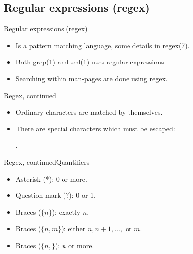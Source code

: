 \documentclass[handout]{beamer}
\begin{document}
\subsection{Regular expressions (regex)}

\begin{frame}{Regular expressions (regex)}
	\begin{itemize}
		\item Is a pattern matching language, some details in regex(7).

		\item Both grep(1) and sed(1) uses regular expressions.

		\item Searching within man-pages are done using regex.

	\end{itemize}
\end{frame}

\begin{frame}{Regex, continued}
	\begin{itemize}
		\item Ordinary characters are matched by themselves.

		\item There are special characters which must be escaped:
			\begin{center}
				.
			\end{center}

	\end{itemize}
\end{frame}

\begin{frame}{Regex, continued}{Quantifiers}
	\begin{itemize}
		\item Asterisk (*): 0 or more.

		\item Question mark (?): 0 or 1.

		\item Braces (\(\{n\}\)): exactly \(n\).

		\item Braces (\(\{n,m\}\)): either \(n, n+1, \ldots,\) or \(m\).

		\item Braces (\(\{n,\}\)): \(n\) or more.

	\end{itemize}
\end{frame}
\end{document}
